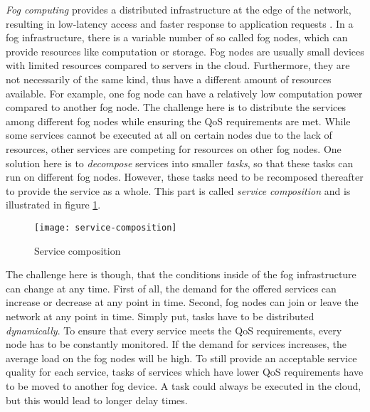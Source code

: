 \textit{Fog computing} provides a distributed infrastructure at the edge of the network, resulting in low-latency access and faster response to application requests \cite{mobility-aware-scheduling}.
In a fog infrastructure, there is a variable number of so called fog nodes, which can provide resources like computation or storage.
Fog nodes are usually small devices with limited resources compared to servers in the cloud.
Furthermore, they are not necessarily of the same kind, thus have a different amount of resources available.
For example, one fog node can have a relatively low computation power compared to another fog node.
The challenge here is to distribute the services among different fog nodes while ensuring the QoS requirements are met.
While some services cannot be executed at all on certain nodes due to the lack of resources, other services are competing for resources on other fog nodes.
One solution here is to \textit{decompose} services into smaller \textit{tasks}, so that these tasks can run on different fog nodes.
However, these tasks need to be recomposed thereafter to provide the service as a whole.
This part is called \textit{service composition} and is illustrated in figure \ref{fig:service-composition}.\\

\begin{figure}
    \centering
    \texttt{[image: service-composition]}
    \caption{Service composition}
    \label{fig:service-composition}
\end{figure}

The challenge here is though, that the conditions inside of the fog infrastructure can change at any time.
First of all, the demand for the offered services can increase or decrease at any point in time.
Second, fog nodes can join or leave the network at any point in time.
Simply put, tasks have to be distributed \textit{dynamically}.
To ensure that every service meets the QoS requirements, every node has to be constantly monitored.
If the demand for services increases, the average load on the fog nodes will be high.
To still provide an acceptable service quality for each service, tasks of services which have lower QoS requirements have to be moved to another fog device.
A task could always be executed in the cloud, but this would lead to longer delay times.
